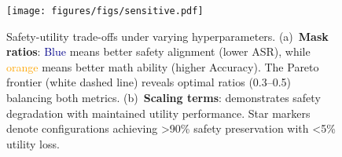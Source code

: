 
\begin{figure}[!ht]
            \centering
            \texttt{[image: figures/figs/sensitive.pdf]} 
            \caption{Safety-utility trade-offs under varying hyperparameters. 
            (a)~\textbf{Mask ratios}: \textcolor{darkblue}{Blue} means better safety alignment (lower ASR), while \textcolor{orange}{orange} means better math ability (higher Accuracy). The Pareto frontier (white dashed line) reveals optimal ratios (0.3–0.5) balancing both metrics.
            (b)~\textbf{Scaling terms}: demonstrates safety degradation with maintained utility performance. Star markers denote configurations achieving >90\% safety preservation with <5\% utility loss.}
     \label{fig:sensitive}
     \vspace{-10pt}
\end{figure}